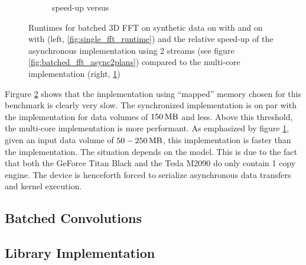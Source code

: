 \begin{figure}[h]
\begin{subfigure}[b]{0.45\textwidth}
    \caption{\gpu{} speed-up versus \cpu{}}
    \label{fig:batched_fft_speed_up}
  \end{subfigure}
  \hfill
  \caption{Runtimes for batched 3D FFT on synthetic data on \cpu{} with \fftw{} and on \gpu{} with \cufft{} (left, \ref{fig:single_fft_runtime}) and the relative speed-up of the asynchronous \gpu{} implementation using 2 streams (see figure \ref{fig:batched_fft_async2plans}) compared to the multi-core \cpu{} implementation (right, \ref{fig:batched_fft_speed_up})}
  \label{fig:rt_batched_fft}
\end{figure}


Firgure \ref{fig:rt_batched_fft} shows that the implementation using ``mapped'' memory chosen for this benchmark is clearly very slow. The synchronized implementation is on par with the \cpu{} implementation for data volumes of $\unit[150]{MB}$ and less. Above this threshold, the multi-core implementation is more performant. As emphasized by figure \ref{fig:batched_fft_speed_up}, given an input data volume of $\unit[50-250]{MB}$, this implementation is faster than the \cpu{} implementation. The situation depends on the \gpu{} model. This is due to the fact that both the GeForce Titan Black and the Tesla M2090 do only contain 1 copy engine. The device is henceforth forced to serialize asynchronous data transfers and kernel execution.

\subsection{Batched Convolutions}


\subsection{Library Implementation}

